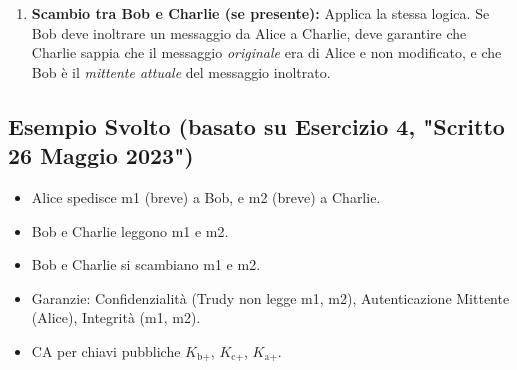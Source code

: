 \begin{enumerate}[label=\arabic*.]
    \item \textbf{Scambio tra Bob e Charlie (se presente):} Applica la stessa logica. Se Bob deve inoltrare un messaggio da Alice a Charlie, deve garantire che Charlie sappia che il messaggio \textit{originale} era di Alice e non modificato, e che Bob è il \textit{mittente attuale} del messaggio inoltrato.
\end{enumerate}

\subsection{Esempio Svolto (basato su Esercizio 4, "Scritto 26 Maggio 2023")}
\begin{itemize}
    \item Alice spedisce m1 (breve) a Bob, e m2 (breve) a Charlie.
    \item Bob e Charlie leggono m1 e m2.
    \item Bob e Charlie si scambiano m1 e m2.
    \item Garanzie: Confidenzialità (Trudy non legge m1, m2), Autenticazione Mittente (Alice), Integrità (m1, m2).
    \item CA per chiavi pubbliche $K_{\text{b+}}$, $K_{\text{c+}}$, $K_{\text{a+}}$.
\end{itemize}

